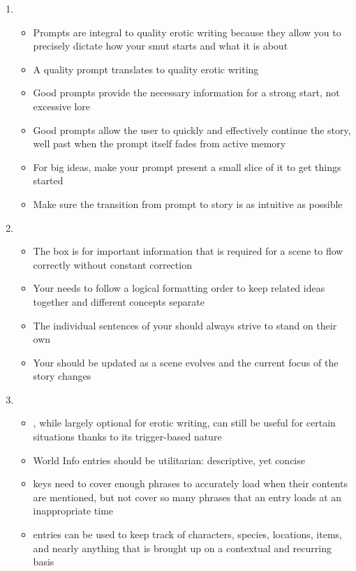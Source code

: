﻿\documentclass[Coomer-main.tex]{subfiles}
\begin{document}
\begin{enumerate}

\item {}

\begin{itemize}
\item Prompts are integral to quality erotic writing because they allow you to precisely dictate how your smut starts and what it is about
\item A quality prompt translates to quality erotic writing
\item Good prompts provide the necessary information for a strong start, not excessive lore
\item Good prompts allow the user to quickly and effectively continue the story, well past when the prompt itself fades from active memory
\item For big ideas, make your prompt present a small slice of it to get things started
\item Make sure the transition from prompt to story is as intuitive as possible
\end{itemize}

\item {}

\begin{itemize}
\item The \rem box is for important information that is required for a scene to flow correctly without constant correction
\item Your \rem needs to follow a logical formatting order to keep related ideas together and different concepts separate
\item The individual sentences of your \rem should always strive to stand on their own
\item Your \rem should be updated as a scene evolves and the current focus of the story changes
\end{itemize}

\item {}

\begin{itemize}
\item \wi, while largely optional for erotic writing, can still be useful for certain situations thanks to its trigger-based nature
\item World Info entries should be utilitarian: descriptive, yet concise
\item \wi keys need to cover enough phrases to accurately load when their contents are mentioned, but not cover so many phrases that an entry loads at an inappropriate time
\item \wi entries can be used to keep track of characters, species, locations, items, and nearly anything that is brought up on a contextual and recurring basis
\end{itemize}


\end{enumerate}
\end{document}
